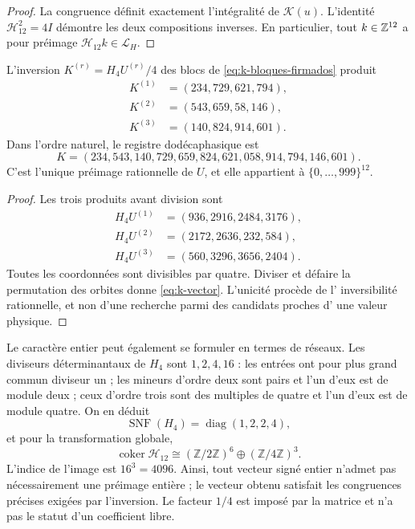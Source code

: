 \begin{proof}
La congruence définit exactement l'intégralité de \(\mathscr K(u)\).
L'identité \(\mathcal H_{12}^2=4I\) démontre les deux compositions
inverses. En particulier, tout \(k\in\mathbb Z^{12}\) a pour préimage
\(\mathcal H_{12}k\in\mathcal L_H\).
\end{proof}

\begin{proposition}
\label{prop:k-sello}
L'inversion \(K^{(r)}=H_4U^{(r)}/4\) des blocs de
\eqref{eq:k-bloques-firmados} produit
\begin{align*}
 K^{(1)}&=(234,729,621,794),\\
 K^{(2)}&=(543,659,58,146),\\
 K^{(3)}&=(140,824,914,601).
\end{align*}
Dans l'ordre naturel, le registre dodécaphasique est
\begin{equation}
 K=(234,543,140,729,659,824,621,058,914,794,146,601).
 \label{eq:k-vector}
\end{equation}
C'est l'unique préimage rationnelle de \(U\), et elle appartient à \(\{0,\ldots,999\}^{12}\).
\end{proposition}

\begin{proof}
Les trois produits avant division sont
\begin{align*}
 H_4U^{(1)}&=(936,2916,2484,3176),\\
 H_4U^{(2)}&=(2172,2636,232,584),\\
 H_4U^{(3)}&=(560,3296,3656,2404).
\end{align*}
Toutes les coordonnées sont divisibles par quatre. Diviser et défaire la
permutation des orbites donne \eqref{eq:k-vector}. L'unicité procède de l'
inversibilité rationnelle, et non d'une recherche parmi des candidats proches d'
une valeur physique.
\end{proof}

Le caractère entier peut également se formuler en termes de réseaux. Les diviseurs déterminantaux de \(H_4\) sont \(1,2,4,16\) : les entrées ont pour plus grand commun diviseur un ; les mineurs d'ordre deux sont pairs et l'un d'eux est de module deux ; ceux d'ordre trois sont des multiples de quatre et l'un d'eux est de module quatre. On en déduit
\[
 \operatorname{SNF}(H_4)=\operatorname{diag}(1,2,2,4),
\]
et pour la transformation globale,
\[
 \operatorname{coker}\mathcal H_{12}
 \cong(\mathbb Z/2\mathbb Z)^6\oplus(\mathbb Z/4\mathbb Z)^3.
\]
L'indice de l'image est \(16^3=4096\). Ainsi, tout vecteur signé
entier n'admet pas nécessairement une préimage entière ; le vecteur obtenu satisfait les
congruences précises exigées par l'inversion. Le facteur \(1/4\) est
imposé par la matrice et n'a pas le statut d'un coefficient libre.


